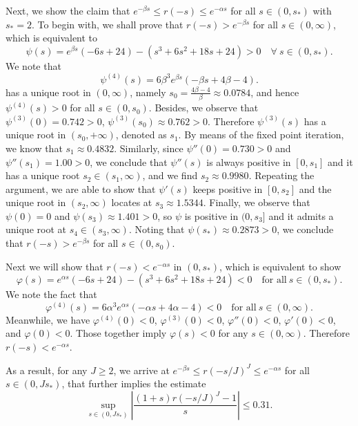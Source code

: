 \documentclass[a4paper, oneside]{book}
\begin{document}
Next, we show the claim that $e^{-\beta s} \le r(-s) \le e^{-\alpha s}$ for all $s\in(0,s_*)$ with $s_*=2$. To begin with, we shall prove that $r(-s) > e^{-\beta s}$ for all $s\in(0,\infty)$, which is equivalent to
$$\psi(s) = e^{\beta s} (-6s+24) - (s^3+6s^2+18s+24) >0
\quad \forall ~s\in (0, s_*).$$
We note that
$$\psi^{(4)}(s) = 6\beta^3e^{\beta s}(-\beta s + 4\beta - 4).$$
has a unique root in $(0,\infty)$, namely
$s_0= \frac{4\beta - 4}{\beta} \approx0.0784$, and hence
$\psi^{(4)}(s)> 0$ for all $s\in(0,s_0)$.
Besides, we observe that
$\psi^{(3)}(0) = 0.742 >0$, $\psi^{(3)}(s_0) \approx 0.762 >0$.
Therefore $\psi^{(3)}(s)$ has a unique root
in $(s_0, +\infty)$,
denoted as $s_1$. By means of the fixed point iteration, we know that
$s_1\approx 0.4832$.
Similarly, since $\psi''(0) =  0.730>0$ and $\psi''(s_1) =  1.00>0$, we conclude that $\psi''(s)$ is always positive in $[0,s_1]$ and it
has a unique root $s_2\in (s_1,\infty)$, and we find $s_2\approx 0.9980$.
Repeating the argument, we are able to show that
$\psi'(s)$ keeps positive in $[0,s_2]$ and
the unique root in $(s_2,\infty)$ locates at
$s_3 \approx 1.5344$.
Finally, we observe that $\psi(0) = 0$ and $\psi(s_3) \approx 1.401>0$, so $\psi$ is positive in $(0,s_3]$
and it admits a unique root at $s_4\in(s_3,\infty)$.
Noting that $\psi(s_*) \approx 0.2873 > 0$,
we conclude that $r(-s) > e^{-\beta s}$ for all $s\in(0,s_0)$.

Next we will show that $r(-s) < e^{-\alpha s}$ in $(0, s_*)$, which is equivalent to show
\begin{equation*}
    \varphi(s) = e^{\alpha s} (-6s+24) - (s^3+6s^2+18s+24) < 0 \quad \text{for all} ~s\in (0, s_*).
\end{equation*}
We note the fact that
\begin{equation*}
\varphi^{(4)}(s) = 6\alpha^3e^{\alpha s}(-\alpha s + 4\alpha - 4)<0\quad \text{for all} ~s\in (0, \infty).
\end{equation*}
Meanwhile, we have $\varphi^{(4)}(0)<0$, $\varphi^{(3)}(0)<0$, $\varphi''(0)<0$, $\varphi'(0)<0$, and $\varphi(0)<0$.
Those together imply $\varphi(s) <0$ for any
$s\in (0, \infty)$. Therefore $r(-s) < e^{-\alpha s}$.

As a result, for any $J\ge 2$, we arrive at $e^{-\beta s} \le r(-s/J)^J \le e^{-\alpha s}$
for all $s\in(0, J s_*)$, that further implies the estimate
\begin{equation*}
    \sup_{s\in(0, J s_*)}
    \left|\frac{(1+s) r(-s/J)^J-1}{s}\right| \le 0.31.
\end{equation*}
\end{document}
